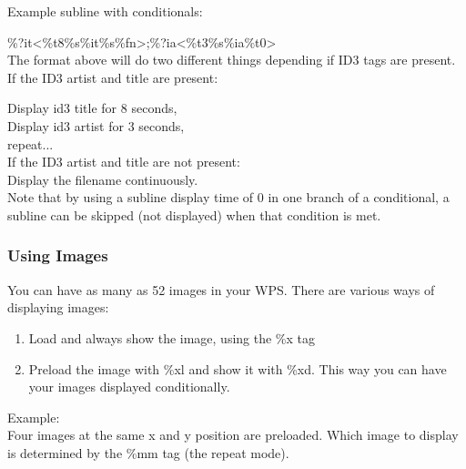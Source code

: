 Example subline with conditionals:

\%?it{\textless}\%t8\%s\%it{\textbar}\%s\%fn{\textgreater};\%?ia{\textless}\%t3\%s\%ia{\textbar}\%t0{\textgreater}\\

The format above will do two different things depending if ID3 tags are present. If the ID3 artist and title are present:

Display id3 title for 8 seconds,\\

Display id3 artist for 3 seconds,\\

repeat...\\

If the ID3 artist and title are not present:\\

Display the filename continuously.\\

Note that by using a subline display time of 0 in one branch of a conditional,
a subline can be skipped (not displayed) when that condition is met. 


\subsubsection{Using Images}
You can have as many as 52 images in your WPS. There are various ways of 
displaying images:
\begin{enumerate}
  \item Load and always show the image, using the \%x tag
  \item Preload the image with \%xl and show it with \%xd. This way you can 
        have your images displayed conditionally.
\end{enumerate}

Example:\\
 Four
images at the same x and y position are preloaded. Which image to display is 
determined by the \%mm tag (the repeat mode).

